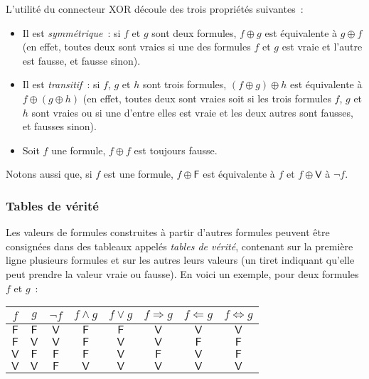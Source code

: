 L'utilité du connecteur XOR découle des trois propriétés suivantes : 
\begin{itemize}[nosep]
    \item Il est \textit{symmétrique} : si $f$ et $g$ sont deux formules, $f \oplus g$ est équivalente à $g \oplus f$ (en effet, toutes deux sont vraies si une des formules $f$ et $g$ est vraie et l'autre est fausse, et fausse sinon).
    \item Il est \textit{transitif} : si $f$, $g$ et $h$ sont trois formules, $(f \oplus g) \oplus h$ est équivalente à $f \oplus (g \oplus h)$ (en effet, toutes deux sont vraies soit si les trois formules $f$, $g$ et $h$ sont vraies ou si une d'entre elles est vraie et les deux autres sont fausses, et fausses sinon).
    \item Soit $f$ une formule, $f \oplus f$ est toujours fausse.
\end{itemize}
Notons aussi que, si $f$ est une formule, $f \oplus \mathsf{F}$ est équivalente à $f$ et $f \oplus \mathsf{V}$ à $\neg f$.

\subsubsection{Tables de vérité}

Les valeurs de formules construites à partir d'autres formules peuvent être consignées dans des tableaux appelés \textit{tables de vérité}, contenant sur la première ligne plusieurs formules et sur les autres leurs valeurs (un tiret indiquant qu'elle peut prendre la valeur vraie ou fausse). 
En voici un exemple, pour deux formules $f$ et $g$ : 

\begin{center}
\begin{tabular}{c c | c c c c c c}
    $f$ & $g$ & $\neg f$ & $f \wedge g$ & $f \vee g$ & $f \Rightarrow g$ & $f \Leftarrow g$ & $f \Leftrightarrow g$ 
    \\ \hline 
    $\mathsf{F}$ & $\mathsf{F}$ & $\mathsf{V}$ & $\mathsf{F}$ & $\mathsf{F}$ & $\mathsf{V}$ & $\mathsf{V}$ & $\mathsf{V}$
    \\
    $\mathsf{F}$ & $\mathsf{V}$ & $\mathsf{V}$ & $\mathsf{F}$ & $\mathsf{V}$ & $\mathsf{V}$ & $\mathsf{F}$ & $\mathsf{F}$
    \\ 
    $\mathsf{V}$ & $\mathsf{F}$ & $\mathsf{F}$ & $\mathsf{F}$ & $\mathsf{V}$ & $\mathsf{F}$ & $\mathsf{V}$ & $\mathsf{F}$ 
    \\ 
    $\mathsf{V}$ & $\mathsf{V}$ & $\mathsf{F}$ & $\mathsf{V}$ & $\mathsf{V}$ & $\mathsf{V}$ & $\mathsf{V}$ & $\mathsf{V}$ 
\end{tabular}
\end{center}

